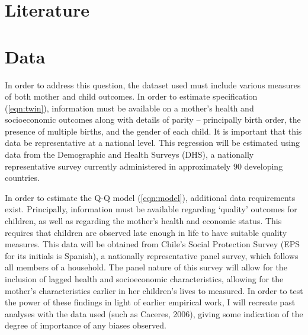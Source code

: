 \documentclass{article}[11pt,subeqn]
\begin{document}
\begin{spacing}{1.25}
\section{Literature}
\label{scn:lit}
\vspace{-5mm}

\section{Data}
\label{scn:data}
\vspace{-5mm}
In order to address this question, the dataset used must include various measures of both mother and child
outcomes. In order to estimate specification (\ref{eqn:twin}), information must be available on a mother's
health and socioeconomic outcomes along with details of parity -- principally birth order, the presence
of multiple births, and the gender of each child.  It is important that this data be representative at a
national level.  This regression will be estimated using data from the Demographic and Health Surveys (DHS),
a nationally representative survey currently administered in approximately 90 developing countries.

In order to estimate the Q-Q model (\ref{eqn:model}), additional data requirements exist.  Principally,
information must be available regarding `quality' outcomes for children, as well as regarding the mother's
health and economic status.  This requires that children are observed late enough in life to have suitable
quality measures.  This data will be obtained from Chile's Social Protection Survey (EPS for its initials
is Spanish), a nationally representative panel survey, which follows all members of a household.  The panel
nature of this survey will allow for the inclusion of lagged health and socioeconomic characteristics,
allowing for the mother's characteristics earlier in her children's lives to measured.  In order to test
the power of these findings in light of earlier empirical work, I will recreate past analyses with the
data used (such as Caceres, 2006), giving some indication of the degree of importance of any biases observed.


\end{spacing}
\end{document}
